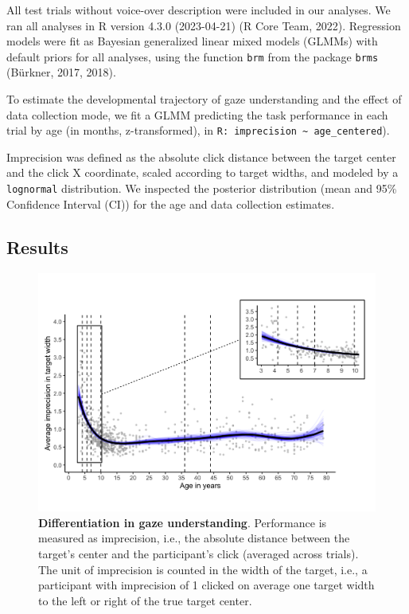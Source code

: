 \documentclass[
  man,floatsintext]{apa6}
\begin{document}
All test trials without voice-over description were included in our analyses.
We ran all analyses in R version 4.3.0 (2023-04-21) (R Core Team, 2022).
Regression models were fit as Bayesian generalized linear mixed models (GLMMs) with default priors for all analyses, using the function \texttt{brm} from the package \texttt{brms} (Bürkner, 2017, 2018).

To estimate the developmental trajectory of gaze understanding and the effect of data collection mode, we fit a GLMM predicting the task performance in each trial by age (in months, z-transformed), in \texttt{R:\ imprecision\ \textasciitilde{}\ age\_centered}).

Imprecision was defined as the absolute click distance between the target center and the click X coordinate, scaled according to target widths, and modeled by a \texttt{lognormal} distribution.
We inspected the posterior distribution (mean and 95\% Confidence Interval (CI)) for the age and data collection estimates.

\hypertarget{results}{%
\subsection{Results}\label{results}}



\begin{figure}

{\centering \includegraphics[width=1\linewidth]{../figures/lifespan_plot} 

}

\caption{\textbf{Differentiation in gaze understanding}. Performance is measured as imprecision, i.e., the absolute distance between the target's center and the participant's click (averaged across trials). The unit of imprecision is counted in the width of the target, i.e., a participant with imprecision of 1 clicked on average one target width to the left or right of the true target center.}\label{fig:fig2}
\end{figure}
\end{document}
